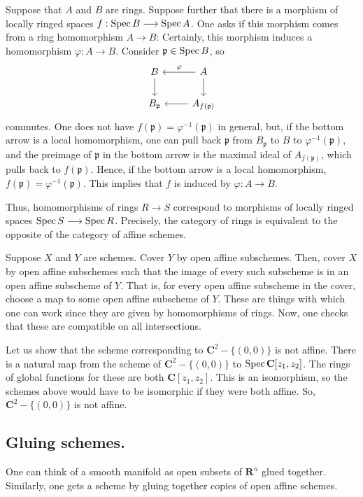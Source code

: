 \documentclass [11 pt, oneside] {article}
\begin{document}
Suppose that $A$ and $B$ are rings. Suppose further that there is a morphism of locally ringed spaces $f:\operatorname{Spec} B\longrightarrow \operatorname{Spec} A$. One asks if this morphism comes from a ring homomorphism $A\longrightarrow B$: Certainly, this morphism induces a homomorphism $\varphi : A\longrightarrow B$. Consider $\mathfrak{p}\in \operatorname{Spec} B$, so
\[
\begin{tikzcd}
	B \ar[d] & A \ar[l,"\varphi", swap] \ar[d] \\ B_{\mathfrak{p}} &A_{f(\mathfrak{p}) } \ar[l]
\end{tikzcd}
\]
commutes.
One does not have $f(\mathfrak{p}) = \varphi ^{-1}(\mathfrak{p})$ in general, but, if the bottom arrow is a local homomorphism, one can pull back $\mathfrak{p}$ from $B_{\mathfrak{p}}$ to $B$ to $\varphi^{-1}(\mathfrak{p})$, and the preimage of $\mathfrak{p}$ in the bottom arrow is the maximal ideal of $A_{f(\mathfrak{p}) }$, which pulls back to $f(\mathfrak{p})$. Hence, if the bottom arrow is a local homomorphism, $f(\mathfrak{p}) = \varphi^{-1}(\mathfrak{p})$. This implies that $f$ is induced by $\varphi : A\longrightarrow B$.

Thus, homomorphisms of rings $R\longrightarrow S$ correspond to morphisms of locally ringed spaces $\operatorname{Spec} S \longrightarrow \operatorname{Spec} R$. Precisely, the category of rings is equivalent to the opposite of the category of affine schemes.

Suppose $X$ and $Y$ are schemes. Cover $Y$ by open affine subschemes. Then, cover $X$ by open affine subschemes such that the image of every such subscheme is in an open affine subscheme of $Y$. That is, for every open affine subscheme in the cover, choose a map to some open affine subscheme of $Y$. These are things with which one can work since they are given by homomorphisms of rings. Now, one checks that these are compatible on all intersections.

\begin{example}[ ]\label{}\text{}
Let us show that the scheme corresponding to $\mathbf{C}^2 - \{(0,0)\}$ is not affine. There is a natural map from the scheme of $\mathbf{C}^2-\{(0,0)\}$ to $\operatorname{Spec} \mathbf{C}[z_1,z_2]$. The rings of global functions for these are both $\mathbf{C}[z_1,z_2]$. This is an isomorphism, so the schemes above would have to be isomorphic if they were both affine. So, $\mathbf{C}^2-\{(0,0)\}$ is not affine. 
\end{example}

\subsection{Gluing schemes.}
One can think of a smooth manifold as open subsets of $\mathbf{R}^n$ glued together. Similarly, one gets a scheme by gluing together copies of open affine schemes.
\end{document}
